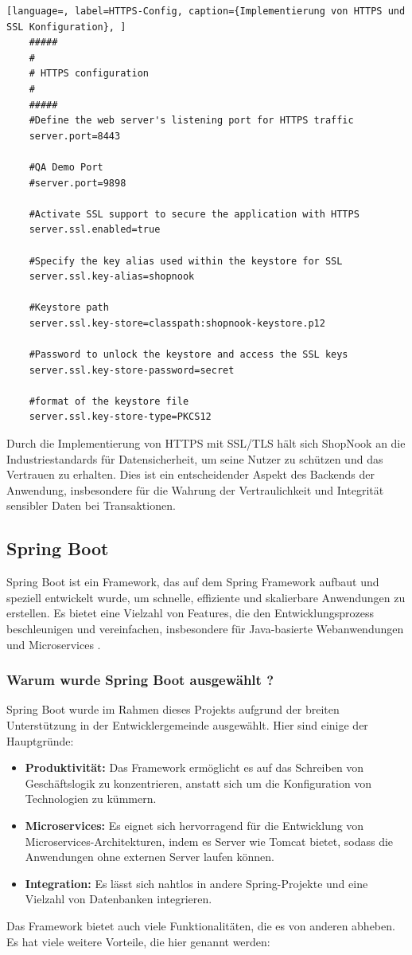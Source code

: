 \begin{lstlisting}[language=, label=HTTPS-Config, caption={Implementierung von HTTPS und SSL Konfiguration}, ]
	#####
	#
	# HTTPS configuration
	#
	#####
	#Define the web server's listening port for HTTPS traffic
	server.port=8443 
	
	#QA Demo Port
	#server.port=9898
	
	#Activate SSL support to secure the application with HTTPS
	server.ssl.enabled=true
	
	#Specify the key alias used within the keystore for SSL
	server.ssl.key-alias=shopnook
	
	#Keystore path
	server.ssl.key-store=classpath:shopnook-keystore.p12
	
	#Password to unlock the keystore and access the SSL keys
	server.ssl.key-store-password=secret
	
	#format of the keystore file
	server.ssl.key-store-type=PKCS12
\end{lstlisting}



Durch die Implementierung von HTTPS mit SSL/TLS hält sich ShopNook an die Industriestandards für Datensicherheit, um seine Nutzer zu schützen und das Vertrauen zu erhalten. Dies ist ein entscheidender Aspekt des Backends der Anwendung, insbesondere für die Wahrung der Vertraulichkeit und Integrität sensibler Daten bei Transaktionen.

\subsection{Spring Boot}

Spring Boot ist ein Framework, das auf dem Spring Framework aufbaut und speziell entwickelt wurde, um schnelle, effiziente und skalierbare Anwendungen zu erstellen. Es bietet eine Vielzahl von Features, die den Entwicklungsprozess beschleunigen und vereinfachen, insbesondere für Java-basierte Webanwendungen und Microservices \cite{Spring-Framework:o.J}.

\subsubsection{Warum wurde Spring Boot ausgewählt ?}
Spring Boot wurde im Rahmen dieses Projekts aufgrund der breiten Unterstützung in der Entwicklergemeinde ausgewählt. Hier sind einige der Hauptgründe:
\begin{itemize}
	\item \textbf{Produktivität:} Das Framework ermöglicht es auf das Schreiben von Geschäftslogik zu konzentrieren, anstatt sich um die Konfiguration von Technologien zu kümmern.
	\item \textbf{Microservices:} Es eignet sich hervorragend für die Entwicklung von Microservices-Architekturen, indem es Server wie Tomcat bietet, sodass die Anwendungen ohne externen Server laufen können.
	\item \textbf{Integration:} Es lässt sich nahtlos in andere Spring-Projekte und eine Vielzahl von Datenbanken integrieren.
\end{itemize}
Das Framework bietet auch viele Funktionalitäten, die es von anderen abheben. Es hat viele weitere Vorteile, die hier genannt werden:

